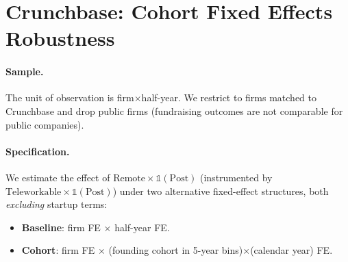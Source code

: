 \documentclass{article}
\newcommand{\cleanedresultsdir}{../results/cleaned/tex}
\begin{document}
\thispagestyle{empty}

\section*{Crunchbase: Cohort Fixed Effects Robustness}

\paragraph{Sample.}
The unit of observation is firm$\times$half-year. We restrict to firms matched to Crunchbase and drop public firms
(fundraising outcomes are not comparable for public companies).

\paragraph{Specification.}
We estimate the effect of $ \text{Remote} \times \mathds{1}(\text{Post}) $ (instrumented by $ \text{Teleworkable} \times \mathds{1}(\text{Post}) $)
under two alternative fixed-effect structures, both \emph{excluding} startup terms:
\begin{itemize}
  \item \textbf{Baseline}: firm FE $\times$ half-year FE.
  \item \textbf{Cohort}: firm FE $\times$ (founding cohort in 5-year bins)$\times$(calendar year) FE.
\end{itemize}

\begin{table}[h!]
\caption{\textbf{Crunchbase Fundraising Outcomes: Baseline vs Cohort(5y)$\times$Year FE}}

\end{table}

\begin{table}[h!]
\caption{\textbf{Additional Outcomes: Rounds, Series A+, and Intensive Margin Robustness}}

\end{table}
\end{document}
